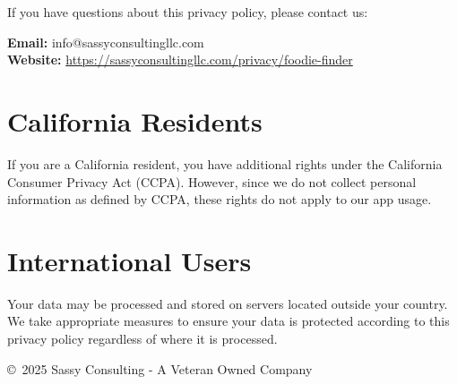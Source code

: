 \documentclass[11pt,letterpaper]{article}
\begin{document}
If you have questions about this privacy policy, please contact us:

\textbf{Email:} info@sassyconsultingllc.com \\
\textbf{Website:} \url{https://sassyconsultingllc.com/privacy/foodie-finder}

\section{California Residents}

If you are a California resident, you have additional rights under the California Consumer Privacy Act (CCPA). However, since we do not collect personal information as defined by CCPA, these rights do not apply to our app usage.

\section{International Users}

Your data may be processed and stored on servers located outside your country. We take appropriate measures to ensure your data is protected according to this privacy policy regardless of where it is processed.

\vfill
\begin{center}
\copyright~2025 Sassy Consulting - A Veteran Owned Company
\end{center}
\end{document}
